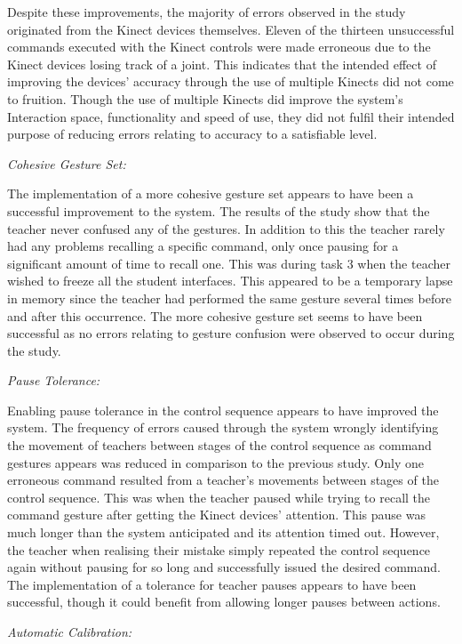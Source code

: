 \documentclass[link]{IWCOMP}
\begin{document}
Despite these improvements, the majority of errors observed in the study originated from the Kinect devices themselves.
Eleven of the thirteen unsuccessful commands executed with the Kinect controls were made erroneous due to the Kinect devices losing track of a joint.
This indicates that the intended effect of improving the devices' accuracy through the use of multiple Kinects did not come to fruition.
Though the use of multiple Kinects did improve the system's Interaction space, functionality and speed of use, they did not fulfil their intended purpose of reducing errors relating to accuracy to a satisfiable level.

\emph{Cohesive Gesture Set:}

The implementation of a more cohesive gesture set appears to have been a successful improvement to the system.
The results of the study show that the teacher never confused any of the gestures.
In addition to this the teacher rarely had any problems recalling a specific command, only once pausing for a significant amount of time to recall one.
This was during task 3 when the teacher wished to freeze all the student interfaces.
This appeared to be a temporary lapse in memory since the teacher had performed the same gesture several times before and after this occurrence.
The more cohesive gesture set seems to have been successful as no errors relating to gesture confusion were observed to occur during the study.

\emph{Pause Tolerance:}

Enabling pause tolerance in the control sequence appears to have improved the system.
The frequency of errors caused through the system wrongly identifying the movement of teachers between stages of the control sequence as command gestures appears was reduced in comparison to the previous study.
Only one erroneous command resulted from a teacher's movements between stages of the control sequence.
This was when the teacher paused while trying to recall the command gesture after getting the Kinect devices' attention.
This pause was much longer than the system anticipated and its attention timed out.
However, the teacher when realising their mistake simply repeated the control sequence again without pausing for so long and successfully issued the desired command.
The implementation of a tolerance for teacher pauses appears to have been successful, though it could benefit from allowing longer pauses between actions.

\emph{Automatic Calibration:}
\end{document}
